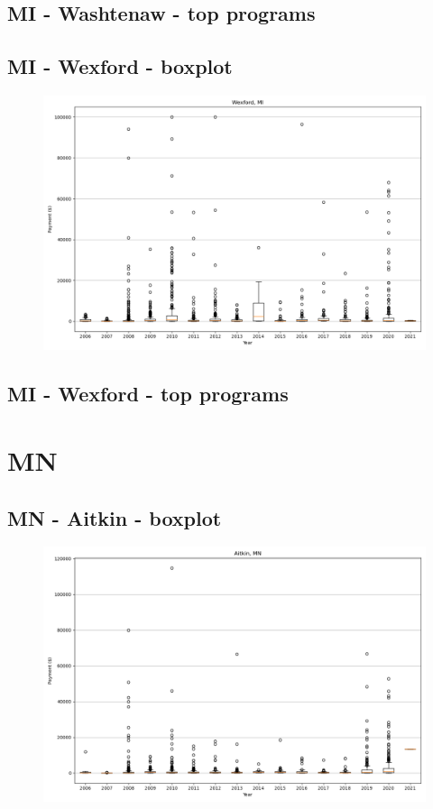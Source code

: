 \subsection*{MI - Washtenaw - top programs}

\newpage
\subsection*{MI - Wexford - boxplot}
\begin{figure}[h]
\centering
\includegraphics[width=7in]{../output/boxplots/counties/Wexford-MI_boxplot.png}
\end{figure}


\subsection*{MI - Wexford - top programs}

\newpage
\section*{MN}
\subsection*{MN - Aitkin - boxplot}
\begin{figure}[h]
\centering
\includegraphics[width=7in]{../output/boxplots/counties/Aitkin-MN_boxplot.png}
\end{figure}


